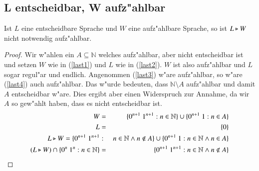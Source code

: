 \subsection{L entscheidbar, W aufz"ahlbar}

\begin{satz}
Ist $L$ eine entscheidbare Sprache und $W$ eine aufz"ahlbare Sprache, so ist $L\triangleright W$ nicht notwendig aufz"ahlbar.
\end{satz}
\begin{proof}
Wir w"ahlen ein $A\subseteq \mathbb{N}$ welches aufz"ahlbar, aber nicht entscheidbar ist und
setzen $W$ wie in (\ref{last1}) und $L$ wie in (\ref{last2}). $W$ ist also aufz"ahlbar und $L$ sogar regul"ar und endlich.
Angenommen (\ref{last3}) w"are aufz"ahlbar, so w"are (\ref{last4}) auch aufz"ahlbar. Das w"urde bedeuten, dass $\mathbb{N}\setminus A$ aufz"ahlbar und damit $A$ entscheidbar w"are. Dies ergibt aber einen Widerspruch zur Annahme, da wir $A$ so gew"ahlt haben, dass es nicht entscheidbar ist.
\setcounter{equation}{0}
\begin{eqnarray}
W&=&\{0^{n+1}\ 1^{n+1} : n\in \mathbb{N} \} \cup \{0^{n+1}\ 1 : n\in A \} \label{last1} \\
L&=&\{0\} \label{last2} \\
L\ff W = \{0^{n+1}\ 1^{n+1} &:& n\in\mathbb{N} \wedge n\notin A\} \cup \{0^{n+1}\ 1:n\in \mathbb{N} \wedge n\in A\} \label{last3} \\
(L\ff W)\cap \{0^n\ 1^n : n\in \mathbb{N}\} &=& \{0^{n+1}\ 1^{n+1} : n\in \mathbb{N} \wedge n\notin A\} \label{last4} 
\end{eqnarray}
\end{proof}
